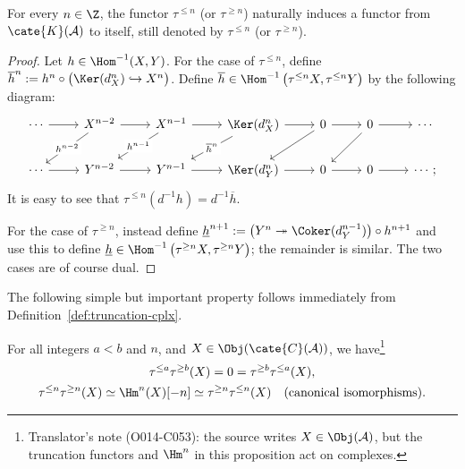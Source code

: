 \begin{definition-proposition}\label{def:K-truncation-functors}
	For every $n \in \Z$, the functor $\tau^{\leq n}$ (or
	$\tau^{\geq n}$) naturally induces a functor from
	$\cate{K}(\mathcal{A})$ to itself, still denoted by $\tau^{\leq n}$ (or
	$\tau^{\geq n}$).
\end{definition-proposition}
\begin{proof}
	Let $h \in \Hom^{-1}(X, Y)$. For the case of $\tau^{\leq n}$, define
	$\overline{h}^n := h^n \circ \bigl(\Ker(d_X^n) \hookrightarrow X^n\bigr)$.
	Define $\overline{h} \in
	\Hom^{-1}\left( \tau^{\leq n} X, \tau^{\leq n} Y \right)$ by the
	following diagram:
	\[\begin{tikzcd}
		\cdots \arrow[r] & X^{n-2} \arrow[r] \arrow[ld, "h^{n-2}" description] & X^{n-1} \arrow[r] \arrow[ld, "{h^{n-1}}" description] & \Ker(d_X^n) \arrow[r] \arrow[ld, "{\overline{h}^n}" description] & 0 \arrow[r] \arrow[ld] & 0 \arrow[r] \arrow[ld] & \cdots \\
		\cdots \arrow[r] & Y^{n-2} \arrow[r] & Y^{n-1} \arrow[r] & \Ker(d_Y^n) \arrow[r] & 0 \arrow[r] & 0 \arrow[r] & \cdots ;
	\end{tikzcd}\]
	It is easy to see that
	$\tau^{\leq n}\left( d^{-1} h \right) = d^{-1} \overline{h}$.

	For the case of $\tau^{\geq n}$, instead define
	$\underline{h}^{n+1} := \bigl(Y^n \twoheadrightarrow
	\Coker(d_Y^{n-1})\bigr) \circ h^{n+1}$ and use this to define
	$\underline{h} \in
	\Hom^{-1}\left( \tau^{\geq n} X, \tau^{\geq n} Y \right)$; the
	remainder is similar. The two cases are of course dual.
\end{proof}

The following simple but important property follows immediately from
Definition~\ref{def:truncation-cplx}.

\begin{proposition}\label{prop:truncate-twice}
	For all integers $a<b$ and $n$, and
	$X \in \Obj(\cate{C}(\mathcal{A}))$, we have\footnote{Translator's note
	(O014-C053): the source writes $X \in \Obj(\mathcal{A})$, but the
	truncation functors and $\Hm^n$ in this proposition act on complexes.}
	\begin{gather*}
		\tau^{\leq a} \tau^{\geq b}(X) = 0 = \tau^{\geq b} \tau^{\leq a}(X), \\
		\tau^{\leq n }\tau^{\geq n}(X) \simeq \Hm^n(X)[-n] \simeq \tau^{\geq n} \tau^{\leq n}(X) \quad \text{(canonical isomorphisms).}
	\end{gather*}
\end{proposition}
